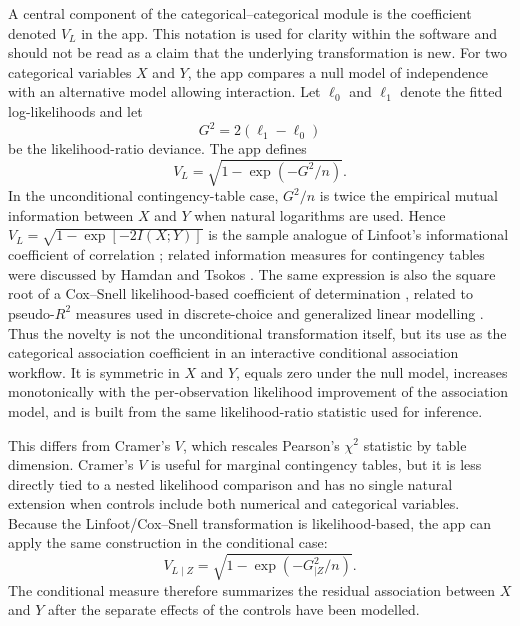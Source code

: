 \documentclass[preprint,12pt,a4paper]{elsarticle}
\numberwithin{equation}{section}
\begin{document}
A central component of the categorical--categorical module is the coefficient denoted $V_L$ in the app. This notation is used for clarity within the software and should not be read as a claim that the underlying transformation is new. For two categorical variables $X$ and $Y$, the app compares a null model of independence with an alternative model allowing interaction. Let $\ell_0$ and $\ell_1$ denote the fitted log-likelihoods and let
\begin{equation}
G^2 = 2(\ell_1-\ell_0)
\label{eq:g2-intro}
\end{equation}
be the likelihood-ratio deviance. The app defines
\begin{equation}
V_L = \sqrt{1-\exp(-G^2/n)}.
\label{eq:vl-intro}
\end{equation}
In the unconditional contingency-table case, $G^2/n$ is twice the empirical mutual information between $X$ and $Y$ when natural logarithms are used. Hence $V_L=\sqrt{1-\exp[-2I(X;Y)]}$ is the sample analogue of Linfoot's informational coefficient of correlation \cite{linfoot1957}; related information measures for contingency tables were discussed by Hamdan and Tsokos \cite{hamdan1971}. The same expression is also the square root of a Cox--Snell likelihood-based coefficient of determination \cite{coxsnell1989}, related to pseudo-$R^2$ measures used in discrete-choice and generalized linear modelling \cite{mcfadden1974,nagelkerke1991}. Thus the novelty is not the unconditional transformation itself, but its use as the categorical association coefficient in an interactive conditional association workflow. It is symmetric in $X$ and $Y$, equals zero under the null model, increases monotonically with the per-observation likelihood improvement of the association model, and is built from the same likelihood-ratio statistic used for inference.

This differs from Cramer's $V$, which rescales Pearson's $\chi^2$ statistic by table dimension. Cramer's $V$ is useful for marginal contingency tables, but it is less directly tied to a nested likelihood comparison and has no single natural extension when controls include both numerical and categorical variables. Because the Linfoot/Cox--Snell transformation is likelihood-based, the app can apply the same construction in the conditional case:
\begin{equation}
V_{L\mid Z} = \sqrt{1-\exp(-G^2_{\mid Z}/n)}.
\label{eq:vlz-intro}
\end{equation}
The conditional measure therefore summarizes the residual association between $X$ and $Y$ after the separate effects of the controls have been modelled.
\end{document}

